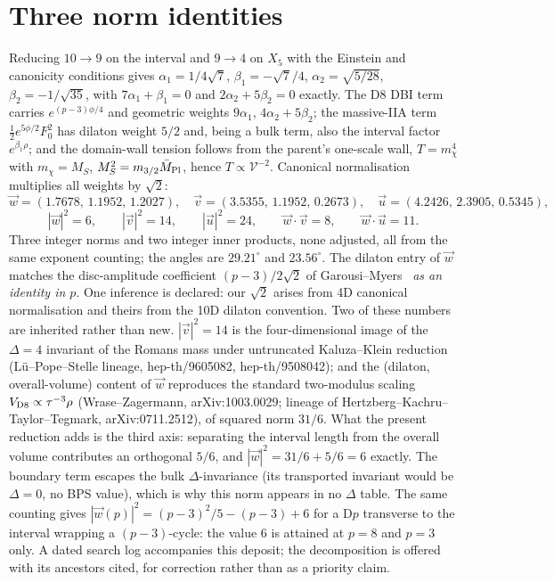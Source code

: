 \section{Three norm identities}
Reducing $10\to9$ on the interval and $9\to4$ on $X_5$ with the Einstein and canonicity conditions gives $\alpha_1=1/4\sqrt7$, $\beta_1=-\sqrt7/4$, $\alpha_2=\sqrt{5/28}$, $\beta_2=-1/\sqrt{35}$, with $7\alpha_1+\beta_1=0$ and $2\alpha_2+5\beta_2=0$ exactly. The D8 DBI term carries $e^{(p-3)\phi/4}$ and geometric weights $9\alpha_1$, $4\alpha_2+5\beta_2$; the massive-IIA term $\tfrac12e^{5\phi/2}F_0^2$ has dilaton weight $5/2$ and, being a bulk term, also the interval factor $e^{\beta_1\rho}$; and the domain-wall tension follows from the parent's one-scale wall, $T=m_\chi^4$ with $m_\chi=M_S$, $M_S^2=m_{3/2}\bar M_{\rm Pl}$, hence $T\propto\mathcal V^{-2}$. Canonical normalisation multiplies all weights by $\sqrt2$:
\begin{equation}
\vec w=(1.7678,\,1.1952,\,1.2027),\quad
\vec v=(3.5355,\,1.1952,\,0.2673),\quad
\vec u=(4.2426,\,2.3905,\,0.5345),
\end{equation}
\begin{equation}
\boxed{\;|\vec w|^2=6,\qquad|\vec v|^2=14,\qquad|\vec u|^2=24,\qquad \vec w\cdot\vec v=8,\qquad \vec w\cdot\vec u=11.\;}
\end{equation}
Three integer norms and two integer inner products, none adjusted, all from the same exponent counting; the angles are $29.21^\circ$ and $23.56^\circ$. The dilaton entry of $\vec w$ matches the disc-amplitude coefficient $(p-3)/2\sqrt2$ of Garousi--Myers~\cite{GM} \emph{as an identity in $p$}. One inference is declared: our $\sqrt2$ arises from 4D canonical normalisation and theirs from the 10D dilaton convention. Two of these numbers are inherited rather than new. $|\vec v|^2=14$ is the four-dimensional image of the $\Delta=4$ invariant of the Romans mass under untruncated Kaluza--Klein reduction (L\"u--Pope--Stelle lineage, hep-th/9605082, hep-th/9508042); and the (dilaton, overall-volume) content of $\vec w$ reproduces the standard two-modulus scaling $V_{\rm D8}\propto\tau^{-3}\rho$ (Wrase--Zagermann, arXiv:1003.0029; lineage of Hertzberg--Kachru--Taylor--Tegmark, arXiv:0711.2512), of squared norm $31/6$. What the present reduction adds is the third axis: separating the interval length from the overall volume contributes an orthogonal $5/6$, and $|\vec w|^2=31/6+5/6=6$ exactly. The boundary term escapes the bulk $\Delta$-invariance (its transported invariant would be $\Delta=0$, no BPS value), which is why this norm appears in no $\Delta$ table. The same counting gives $|\vec w(p)|^2=(p-3)^2/5-(p-3)+6$ for a D$p$ transverse to the interval wrapping a $(p-3)$-cycle: the value $6$ is attained at $p=8$ and $p=3$ only. A dated search log accompanies this deposit; the decomposition is offered with its ancestors cited, for correction rather than as a priority claim.

